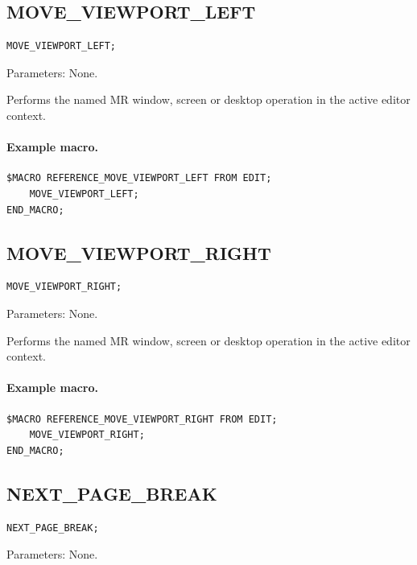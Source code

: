 \documentclass[a4paper,10pt,twoside,openany]{book}
\newenvironment{mrmacextension}{\begin{changebar}}{\end{changebar}}
\begin{document}
\begin{mrmacextension}
\label{prim:procedure-move-viewport-left}
\subsection*{MOVE\_VIEWPORT\_LEFT}
\begin{verbatim}
MOVE_VIEWPORT_LEFT;
\end{verbatim}
Parameters: None.

Performs the named MR window, screen or desktop operation in the active editor context.

\paragraph{Example macro.}
\begin{verbatim}
$MACRO REFERENCE_MOVE_VIEWPORT_LEFT FROM EDIT;
    MOVE_VIEWPORT_LEFT;
END_MACRO;
\end{verbatim}
\end{mrmacextension}

\begin{mrmacextension}
\label{prim:procedure-move-viewport-right}
\subsection*{MOVE\_VIEWPORT\_RIGHT}
\begin{verbatim}
MOVE_VIEWPORT_RIGHT;
\end{verbatim}
Parameters: None.

Performs the named MR window, screen or desktop operation in the active editor context.

\paragraph{Example macro.}
\begin{verbatim}
$MACRO REFERENCE_MOVE_VIEWPORT_RIGHT FROM EDIT;
    MOVE_VIEWPORT_RIGHT;
END_MACRO;
\end{verbatim}
\end{mrmacextension}

\label{prim:procedure-next-page-break}
\subsection*{NEXT\_PAGE\_BREAK}
\begin{verbatim}
NEXT_PAGE_BREAK;
\end{verbatim}
Parameters: None.
\end{document}
